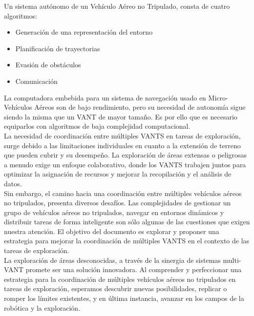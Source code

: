 \documentclass[sigconf]{acmart}
\begin{document}
Un sistema autónomo de un Vehículo Aéreo no Tripulado, consta de cuatro algoritmos:

\begin{itemize}
\item Generación de una representación del entorno
\item Planificación de trayectorias
\item Evasión de obstáculos
\item Comunicación
\end{itemize}

La computadora embebida para un sistema de navegación usado en Micro-Vehículos Aéreos son de bajo rendimiento, pero su necesidad de autonomía sigue siendo la misma que un VANT de mayor tamaño. Es por ello que es necesario equiparlos con algoritmos de baja complejidad computacional.\\

La necesidad de coordinación entre múltiples VANTS en tareas de exploración, surge debido a las limitaciones individuales en cuanto a la extensión de terreno que pueden cubrir y su desempeño. La exploración de áreas extensas o peligrosas a menudo exige un enfoque colaborativo, donde los VANTS trabajen juntos para optimizar la asignación de recursos y mejorar la recopilación y el análisis de datos.\\

Sin embargo, el camino hacia una coordinación entre múltiples vehículos aéreos no tripulados, presenta diversos desafíos. Las complejidades de gestionar un grupo de vehículos aéreos no tripulados, navegar en entornos dinámicos y distribuir tareas de forma inteligente son sólo algunas de las cuestiones que exigen nuestra atención. El objetivo del documento es explorar y proponer una estrategia para mejorar la coordinación de múltiples VANTS en el contexto de las tareas de exploración.\\


La exploración de áreas desconocidas, a través de la sinergia de sistemas multi-VANT promete ser una solución innovadora. Al comprender y perfeccionar una estrategia para la coordinación de múltiples vehículos aéreos no tripulados en tareas de exploración, esperamos descubrir nuevas posibilidades, replicar o romper los límites existentes, y en última instancia, avanzar en los campos de la robótica y la exploración.\\
\end{document}
